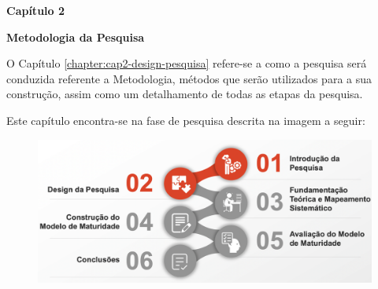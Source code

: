 \newpage


\begin{center}
\newpage
\thispagestyle{plain}
\textbf{\Huge Capítulo 2}
\end{center}
\begin{center}
\textbf{\Huge Metodologia da Pesquisa}
\end{center}
\noindent\makebox[\linewidth]{\rule{\textwidth}{1pt}} 
\begin{flushleft}
O Capítulo \ref{chapter:cap2-design-pesquisa} refere-se a como a pesquisa será conduzida referente a Metodologia, métodos que serão utilizados para a sua construção, assim como um detalhamento de todas as etapas da pesquisa.

\end{flushleft}
\noindent\makebox[\linewidth]{\rule{\textwidth}{1pt}} 

Este capítulo encontra-se na fase de pesquisa descrita na imagem a seguir:
\begin{figure}[ht]
\centering
\includegraphics[width=15cm]{images/part-capitulo2.png}
\label{fig:metodologia-cap2}
\end{figure}